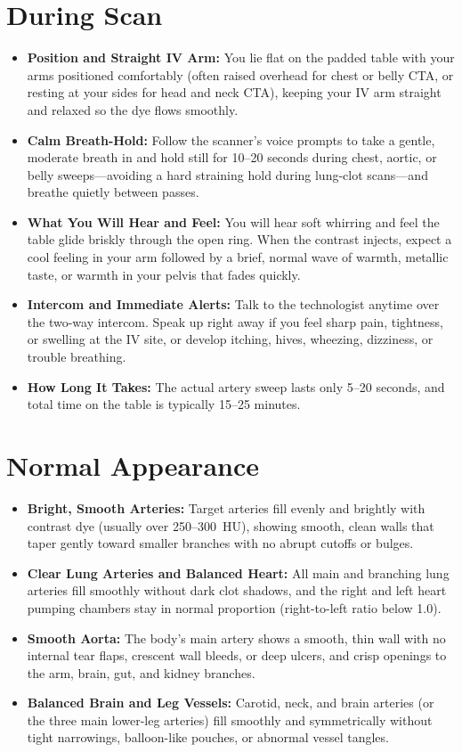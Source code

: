 \section{During Scan}
\begin{itemize}
    \item \textbf{Position and Straight IV Arm:} You lie flat on the padded table with your arms positioned comfortably (often raised overhead for chest or belly CTA, or resting at your sides for head and neck CTA), keeping your IV arm straight and relaxed so the dye flows smoothly.
    \item \textbf{Calm Breath-Hold:} Follow the scanner's voice prompts to take a gentle, moderate breath in and hold still for 10--20 seconds during chest, aortic, or belly sweeps---avoiding a hard straining hold during lung-clot scans---and breathe quietly between passes.
    \item \textbf{What You Will Hear and Feel:} You will hear soft whirring and feel the table glide briskly through the open ring. When the contrast injects, expect a cool feeling in your arm followed by a brief, normal wave of warmth, metallic taste, or warmth in your pelvis that fades quickly.
    \item \textbf{Intercom and Immediate Alerts:} Talk to the technologist anytime over the two-way intercom. Speak up right away if you feel sharp pain, tightness, or swelling at the IV site, or develop itching, hives, wheezing, dizziness, or trouble breathing.
    \item \textbf{How Long It Takes:} The actual artery sweep lasts only 5--20 seconds, and total time on the table is typically 15--25 minutes.
\end{itemize}

\section{Normal Appearance}
\begin{itemize}
    \item \textbf{Bright, Smooth Arteries:} Target arteries fill evenly and brightly with contrast dye (usually over 250--300~HU), showing smooth, clean walls that taper gently toward smaller branches with no abrupt cutoffs or bulges.
    \item \textbf{Clear Lung Arteries and Balanced Heart:} All main and branching lung arteries fill smoothly without dark clot shadows, and the right and left heart pumping chambers stay in normal proportion (right-to-left ratio below 1.0).
    \item \textbf{Smooth Aorta:} The body's main artery shows a smooth, thin wall with no internal tear flaps, crescent wall bleeds, or deep ulcers, and crisp openings to the arm, brain, gut, and kidney branches.
    \item \textbf{Balanced Brain and Leg Vessels:} Carotid, neck, and brain arteries (or the three main lower-leg arteries) fill smoothly and symmetrically without tight narrowings, balloon-like pouches, or abnormal vessel tangles.
\end{itemize}

